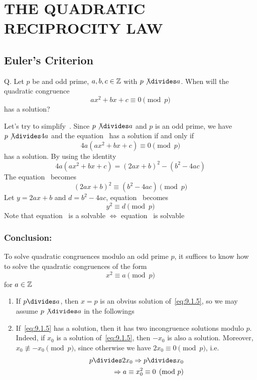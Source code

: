 

\chapter{THE QUADRATIC RECIPROCITY LAW}

\section{Euler's Criterion}

\setcounter{theorem}{0}

Q. Let $p$ be and odd prime, $a, b, c \in \mathbb{Z}$ with $p \not \divides a$.
When will the quadratic congruence 
\[
    \label{eq:9.1.1}
    \tag{1}
    ax^2 + bx + c \equiv 0 \pmod p
\]
has a solution?

Let's try to simplify~. 
Since $p \not \divides a$ and $p$ is an odd prime, we have
$p \not \divides 4a$ and the equation~ has a solution 
if and only if 
\[
    \label{eq:9.1.2}
    \tag{2}
    4a(ax^2 + bx + c) \equiv 0 \pmod p
\]
has a solution.
By using the identity
\[
    4a(ax^2 + bx + c) = {(2ax + b)}^2 - (b^2 - 4ac)
\]
The equation~ becomes
\[
    \label{eq:9.1.3}
    \tag{3}
    {(2ax + b)}^2 \equiv (b^2 - 4ac) \pmod p
\]
Let $y = 2ax + b$ and $d = b^2 - 4ac$, equation~ becomes 
\[
    \label{eq:9.1.4}
    \tag{4}
    y^2 \equiv d \pmod p
\]
Note that equation~ is a solvable $\iff$ 
equation~ is solvable


\bigbreak\hfill

\subsection{Conclusion:}

To solve quadratic congruences modulo an odd prime $p$, 
it suffices to know how to solve the quadratic congruences of the form
\[
    \label{eq:9.1.5}
    \tag{*}
    x^2 \equiv a \pmod p
\]
for $a \in \mathbb{Z}$


\begin{remark}
    \begin{enumerate}
        \item If $p \divides a$, then $x = p$ is an obvius solution of~\eqref{eq:9.1.5},
        so we may assume $p \not \divides a$ in the followings
        \item If~\eqref{eq:9.1.5} has a solution,
        then it has two incongruence solutions modulo $p$.
        Indeed, if $x_0$ is a solution of~\eqref{eq:9.1.5}, then $-x_0$ is also a solution.
        Moreover, $x_0 \not\equiv -x_0 \pmod p$, since otherwise we have $2x_0 \equiv 0 \pmod p$,
        i.e.
        \[
            \begin{aligned}
                p \divides 2x_0 \Rightarrow p \divides x_0\\
                \Rightarrow a \equiv x_0^2 \equiv 0 \pmod p
            \end{aligned}
        \]
    \end{enumerate}
\end{remark}


